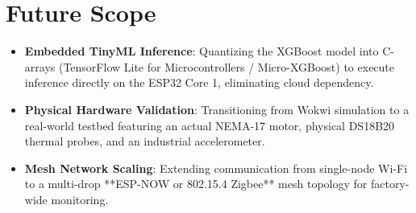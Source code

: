 \documentclass[12pt,a4paper]{report}
\begin{document}
\section{Future Scope}
\begin{itemize}
    \item \textbf{Embedded TinyML Inference}: Quantizing the XGBoost model into C-arrays (TensorFlow Lite for Microcontrollers / Micro-XGBoost) to execute inference directly on the ESP32 Core 1, eliminating cloud dependency.
    \item \textbf{Physical Hardware Validation}: Transitioning from Wokwi simulation to a real-world testbed featuring an actual NEMA-17 motor, physical DS18B20 thermal probes, and an industrial accelerometer.
    \item \textbf{Mesh Network Scaling}: Extending communication from single-node Wi-Fi to a multi-drop **ESP-NOW or 802.15.4 Zigbee** mesh topology for factory-wide monitoring.
\end{itemize}
\end{document}
